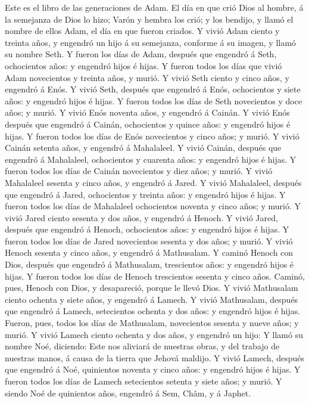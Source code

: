  Este es el libro de las generaciones de Adam. El día en
que crió Dios al hombre, á la semejanza de Dios lo hizo; 
Varón y hembra los crió; y los bendijo, y llamó el nombre de ellos Adam,
el día en que fueron criados.  Y vivió Adam ciento y
treinta años, y engendró un hijo á su semejanza, conforme á su imagen, y
llamó su nombre Seth.  Y fueron los días de Adam, después
que engendró á Seth, ochocientos años: y engendró hijos é hijas.
 Y fueron todos los días que vivió Adam novecientos y
treinta años, y murió.  Y vivió Seth ciento y cinco años,
y engendró á Enós.  Y vivió Seth, después que engendró á
Enós, ochocientos y siete años: y engendró hijos é hijas. 
Y fueron todos los días de Seth novecientos y doce años; y murió.
 Y vivió Enós noventa años, y engendró á Cainán.
 Y vivió Enós después que engendró á Cainán, ochocientos
y quince años: y engendró hijos é hijas.  Y fueron todos
los días de Enós novecientos y cinco años; y murió.  Y
vivió Cainán setenta años, y engendró á Mahalaleel.  Y
vivió Cainán, después que engendró á Mahalaleel, ochocientos y cuarenta
años: y engendró hijos é hijas.  Y fueron todos los días
de Cainán novecientos y diez años; y murió.  Y vivió
Mahalaleel sesenta y cinco años, y engendró á Jared.  Y
vivió Mahalaleel, después que engendró á Jared, ochocientos y treinta
años: y engendró hijos é hijas.  Y fueron todos los días
de Mahalaleel ochocientos noventa y cinco años; y murió. 
Y vivió Jared ciento sesenta y dos años, y engendró á Henoch.
 Y vivió Jared, después que engendró á Henoch,
ochocientos años: y engendró hijos é hijas.  Y fueron
todos los días de Jared novecientos sesenta y dos años; y murió.
 Y vivió Henoch sesenta y cinco años, y engendró á
Mathusalam.  Y caminó Henoch con Dios, después que
engendró á Mathusalam, trescientos años: y engendró hijos é hijas.
 Y fueron todos los días de Henoch trescientos sesenta y
cinco años.  Caminó, pues, Henoch con Dios, y
desapareció, porque le llevó Dios.  Y vivió Mathusalam
ciento ochenta y siete años, y engendró á Lamech.  Y
vivió Mathusalam, después que engendró á Lamech, setecientos ochenta y
dos años: y engendró hijos é hijas.  Fueron, pues, todos
los días de Mathusalam, novecientos sesenta y nueve años; y murió.
 Y vivió Lamech ciento ochenta y dos años, y engendró un
hijo:  Y llamó su nombre Noé, diciendo: Este nos aliviará
de nuestras obras, y del trabajo de nuestras manos, á causa de la tierra
que Jehová maldijo.  Y vivió Lamech, después que engendró
á Noé, quinientos noventa y cinco años: y engendró hijos é hijas.
 Y fueron todos los días de Lamech setecientos setenta y
siete años; y murió.  Y siendo Noé de quinientos años,
engendró á Sem, Châm, y á Japhet.

